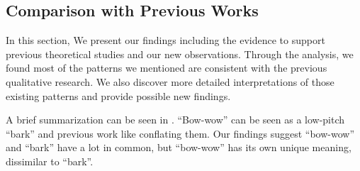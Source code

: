 
    



\subsection{Comparison with Previous Works}
In this section, We present our findings including the evidence to support previous theoretical studies and our new observations.
Through the analysis, we found most of the patterns we mentioned are consistent with the previous qualitative research. We also discover more detailed interpretations of those existing patterns and provide possible new findings.


A brief summarization can be seen in . 
``Bow-wow'' can be seen as a low-pitch ``bark'' and previous work like conflating them. Our findings suggest ``bow-wow'' and ``bark'' have a lot in common, but ``bow-wow'' has its own unique meaning, dissimilar to ``bark''. 


